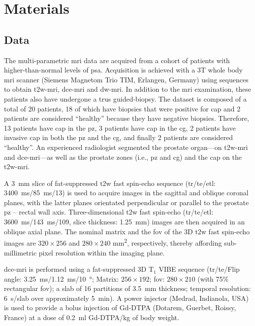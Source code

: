 \section{Materials}\label{sec:materials}

\subsection{Data}\label{sec:data}

The multi-parametric \ac{mri} data are acquired from a cohort of patients with higher-than-normal levels of \ac{psa}.
Acquisition is achieved with a 3T whole body \ac{mri} scanner (Siemens Magnetom Trio TIM, Erlangen, Germany) using sequences to obtain \ac{t2w}-\ac{mri}, \ac{dce}-\ac{mri} and \ac{dw}-\ac{mri}.
In addition to the \ac{mri} examination, these patients also have
undergone a \ac{trus} guided-biopsy.
The dataset is composed of a total of 20 patients, 18 of which have
biopsies that were positive for \ac{cap} and 2 patients are considered
``healthy'' because they have negative biopsies.
Therefore, 13 patients have \ac{cap} in the \ac{pz}, 3 patients have
\ac{cap} in the \ac{cg}, 2 patients have invasive \ac{cap} in both the
\ac{pz} and the \ac{cg}, and finally 2 patients are considered ``healthy''.
An experienced radiologist segmented the prostate organ---on
\ac{t2w}-\ac{mri} and \ac{dce}-\ac{mri}---as well as the prostate
zones (i.e., \ac{pz} and \ac{cg}) and the \ac{cap} on the \ac{t2w}-\ac{mri}.

A \SI{3}{\mm} slice of fat-suppressed \ac{t2w} fast spin-echo sequence
(\ac{tr}/\ac{te}/\ac{etl}: \SI{3400}{\ms}/\SI{85}{\ms}/13) is used to
acquire images in the sagittal and oblique coronal planes, with the latter planes orientated perpendicular or parallel to the prostate \ac{pz} – rectal wall axis.
Three-dimensional \ac{t2w} fast spin-echo (\ac{tr}/\ac{te}/\ac{etl}: \SI{3600}{\ms}/\SI{143}{\ms}/109, slice thickness: \SI{1.25}{\mm}) images are then acquired in an oblique axial plane.
The nominal matrix and the \ac{fov} of the 3D \ac{t2w} fast spin-echo images are $320 \times 256$ and $280 \times 240$ mm\textsuperscript{2}, respectively, thereby affording sub-millimetric pixel resolution within the imaging plane.

\ac{dce}-\ac{mri} is performed using a fat-suppressed 3D T$_1$ VIBE
sequence (\ac{tr}/\ac{te}/Flip angle:
\SI{3.25}{\ms}/\SI{1.12}{\ms}/\SI{10}{\degree}; Matrix: $256 \times
192$; \ac{fov}: $280 \times 210$ (with 75\% rectangular \ac{fov}); a slab of 16 partitions of \SI{3.5}{\mm} thickness; temporal resolution: \SI{6}{\s}/slab over approximately \SI{5}{\minute}).
A power injector (Medrad, Indianola, USA) is used to provide a bolus injection of Gd-DTPA (Dotarem, Guerbet, Roissy, France) at a dose of \SI{0.2}{\ml} Gd-DTPA/kg of body weight.

